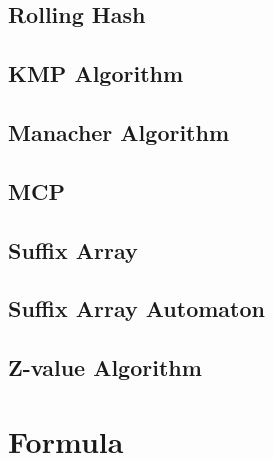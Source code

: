 \documentclass[twocolumn]{article}
\begin{document}
\subsection{Rolling Hash}


\subsection{KMP Algorithm}


\subsection{Manacher Algorithm}


\subsection{MCP}


\subsection{Suffix Array}


\subsection{Suffix Array Automaton}


\subsection{Z-value Algorithm}



\section{Formula}

\end{document}
